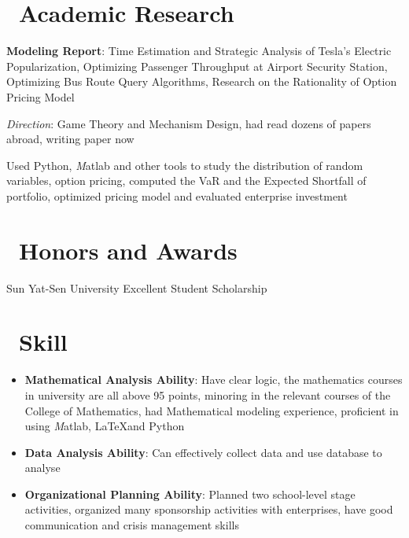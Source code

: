 \documentclass{resume}
\begin{document}
\section{\faFlask\ Academic Research}
\textbf{Modeling Report}: Time Estimation and Strategic Analysis of Tesla’s Electric Popularization, Optimizing Passenger Throughput at Airport Security Station, Optimizing Bus Route Query Algorithms, Research on the Rationality of Option Pricing Model


\textit{Direction}: Game Theory and Mechanism Design, had read dozens of papers abroad, writing paper now


Used Python, \textit{M}atlab and other tools to study the distribution of random variables, option pricing, computed the VaR and the Expected Shortfall of portfolio, optimized pricing model and evaluated enterprise investment

\section{\faHeartO\ Honors and Awards}
Sun Yat-Sen University Excellent Student Scholarship


\section{\faInfo\ Skill}
\begin{itemize}[parsep=0.5ex]
  \item \textbf{Mathematical Analysis Ability}: Have clear logic, the mathematics courses in university are all above 95 points, minoring in the relevant courses of the College of Mathematics, had Mathematical modeling experience, proficient in using \textit{M}atlab, \LaTeX and Python
  \item \textbf{Data Analysis Ability}: Can effectively collect data and use database to analyse
  \item  \textbf{Organizational Planning Ability}: Planned two school-level stage activities, organized many sponsorship activities with enterprises, have good communication and crisis management skills
\end{itemize}

%
%
\end{document}
